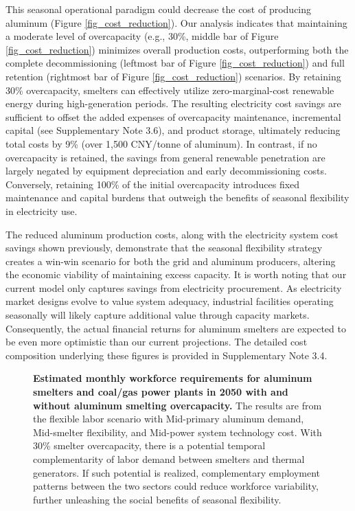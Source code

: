 \documentclass[preprint]{elsarticle}
\begin{document}
This seasonal operational paradigm could decrease the cost of producing aluminum (Figure \ref{fig_cost_reduction}). {Our analysis indicates that maintaining a moderate level of overcapacity (e.g., 30\%, middle bar of Figure \ref{fig_cost_reduction}) minimizes overall production costs, outperforming both the complete decommissioning (leftmost bar of Figure \ref{fig_cost_reduction}) and full retention (rightmost bar of Figure \ref{fig_cost_reduction}) scenarios. By retaining 30\% overcapacity, smelters can effectively utilize zero-marginal-cost renewable energy during high-generation periods. The resulting electricity cost savings are sufficient to offset the added expenses of overcapacity maintenance, incremental capital (see Supplementary Note 3.6), and product storage, ultimately reducing total costs by 9\% (over 1,500 CNY/tonne of aluminum). In contrast, if no overcapacity is retained, the savings from general renewable penetration are largely negated by equipment depreciation and early decommissioning costs. Conversely, retaining 100\% of the initial overcapacity introduces fixed maintenance and capital burdens that outweigh the benefits of seasonal flexibility in electricity use.}

The reduced aluminum production costs, along with the electricity system cost savings shown previously, demonstrate that the seasonal flexibility strategy creates a win-win scenario for both the grid and aluminum producers, altering the economic viability of maintaining excess capacity. It is worth noting that our current model only captures savings from electricity procurement. As electricity market designs evolve to value system adequacy, industrial facilities operating seasonally will likely capture additional value through capacity markets. Consequently, the actual financial returns for aluminum smelters are expected to be even more optimistic than our current projections. The detailed cost composition underlying these figures is provided in Supplementary Note 3.4.

\begin{figure}[H]
  \centering
  \caption{\textbf{Estimated monthly workforce requirements for aluminum smelters and coal/gas power plants in 2050 with and without aluminum smelting overcapacity.} The results are from the flexible labor scenario with Mid-primary aluminum demand, Mid-smelter flexibility, and Mid-power system technology cost. With 30\% smelter overcapacity, there is a potential temporal complementarity of labor demand between smelters and thermal generators. If such potential is realized, complementary employment patterns between the two sectors could reduce workforce variability, further unleashing the social benefits of seasonal flexibility.}
  \label{fig_operation_employment}
\end{figure}
\end{document}
